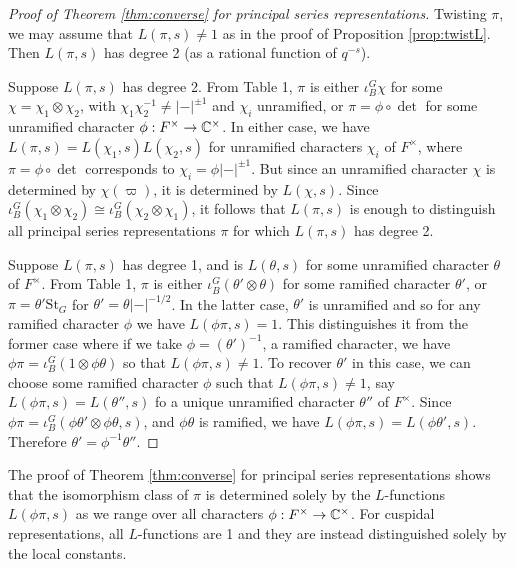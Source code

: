 \begin{proof}[Proof of Theorem \ref{thm:converse} for principal series representations]
    Twisting $\pi$, we may assume that $L(\pi,s) \neq 1$ as in the proof of Proposition \ref{prop:twistL}. Then $L(\pi,s)$ has degree 2 (as a rational function of $q^{-s}$). 

    Suppose $L(\pi,s)$ has degree 2. From Table 1, $\pi$ is either $\iota_B^G \chi$ for some $\chi=\chi_1 \otimes \chi_2$, with $\chi_1\chi_2^{-1} \neq |-|^{\pm 1}$ and $\chi_i$ unramified, or $\pi = \phi \circ \det$ for some unramified character $\phi :F^\times \to \mathbb{C}^\times$. In either case, we have $L(\pi,s)=L(\chi_1,s)L(\chi_2,s)$ for unramified characters $\chi_i$ of $F^\times$, where $\pi = \phi \circ \det$ corresponds to $\chi_i = \phi |-|^{\pm 1}$. But since an unramified character $\chi$ is determined by $\chi(\varpi)$, it is determined by $L(\chi,s)$. Since $\iota_B^G( \chi_1 \otimes \chi_2) \cong \iota_B^G (\chi_2 \otimes \chi_1)$, it follows that $L(\pi,s)$ is enough to distinguish all principal series representations $\pi$ for which $L(\pi,s)$ has degree 2.

    Suppose $L(\pi,s)$ has degree 1, and is $L(\theta,s)$ for some unramified character $\theta$ of $F^\times$. From Table 1, $\pi$ is either $\iota_B^G (\theta' \otimes \theta)$ for some ramified character $\theta'$, or $\pi = \theta' \mathrm{St}_G$ for $\theta' = \theta|-|^{-1/2}$. In the latter case, $\theta'$ is unramified and so for any ramified character $\phi$ we have $L(\phi\pi,s)=1$. This distinguishes it from the former case where if we take $\phi = (\theta')^{-1}$, a ramified character, we have $\phi\pi = \iota_B^G (1 \otimes \phi\theta)$ so that $L(\phi\pi,s) \neq 1$. To recover $\theta'$ in this case, we can choose some ramified character $\phi$ such that $L(\phi\pi,s) \neq 1$, say $L(\phi\pi,s) = L(\theta'',s)$ fo a unique unramified character $\theta''$ of $F^\times$. Since $\phi\pi = \iota_B^G (\phi\theta' \otimes \phi\theta,s)$, and $\phi\theta$ is ramified, we have $L(\phi\pi,s) = L(\phi\theta',s)$. Therefore $\theta' = \phi^{-1}\theta''$.
\end{proof}

\begin{rem}
    The proof of Theorem \ref{thm:converse} for principal series representations shows that the isomorphism class of $\pi$ is determined solely by the $L$-functions $L(\phi\pi,s)$ as we range over all characters $\phi :F^\times \to \mathbb{C}^\times$. For cuspidal representations, all $L$-functions are 1 and they are instead distinguished solely by the local constants.
\end{rem}



